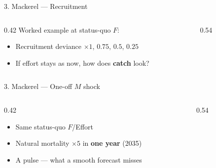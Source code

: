 \documentclass[12pt,aspectratio=169]{beamer}
\begin{document}
\begin{frame}{3. Mackerel --- Recruitment}
  \begin{columns}[T]
    \begin{column}{0.42\textwidth}
      \footnotesize
      Worked example at status-quo $F$:
      \vspace{1mm}
      \begin{itemize}
        \item Recruitment deviance $\times 1$, $0.75$, $0.5$, $0.25$
        \item If effort stays as now, how does \textbf{catch} look?
      \end{itemize}
    \end{column}
    \begin{column}{0.54\textwidth}
      \centering
      \\
    \end{column}
  \end{columns}
\end{frame}

\begin{frame}{3. Mackerel --- One-off $M$ shock}
  \begin{columns}[T]
    \begin{column}{0.42\textwidth}
      \footnotesize
      \begin{itemize}
        \item Same status-quo $F$/Effort
        \item Natural mortality $\times 5$ in \textbf{one year} (2035)
        \item A pulse --- what a smooth forecast misses
      \end{itemize}
    \end{column}
    \begin{column}{0.54\textwidth}
      \centering
      \\
    \end{column}
  \end{columns}
\end{frame}
\end{document}
